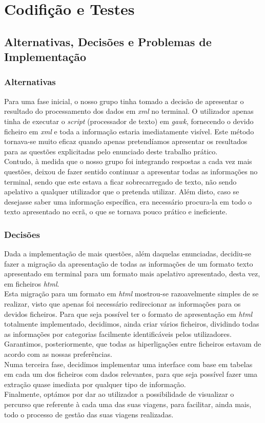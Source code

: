 \documentclass{report}
\begin{document}
\chapter{Codifição e Testes}
\section{Alternativas, Decisões e Problemas de Implementação}
\subsection{Alternativas}
	Para uma fase inicial, o nosso grupo tinha tomado a decisão de apresentar o resultado do processamento dos dados em \textit{xml} no terminal.  O utilizador apenas tinha de executar o \textit{script} (processador de texto) em \textit{gawk}, fornecendo o devido ficheiro em \textit{xml} e toda a informação estaria imediatamente visível. Este método tornava-se muito eficaz quando apenas pretendíamos apresentar os resultados para as questões explicitadas pelo enunciado deste trabalho prático.\\
	Contudo, à medida que o nosso grupo foi integrando respostas a cada vez mais questões, deixou de fazer sentido continuar a apresentar todas as informações no terminal, sendo que este estava a ficar sobrecarregado de texto, não sendo apelativo a qualquer utilizador que o pretenda utilizar. Além disto, caso se desejasse saber uma informação específica, era necessário procura-la em todo o texto apresentado no ecrã, o que se tornava pouco prático e ineficiente.\\
\subsection{Decisões}
	Dada a implementação de mais questões, além daquelas enunciadas, decidiu-se fazer a migração da apresentação de todas as informações de um formato texto apresentado em terminal para um formato mais apelativo apresentado, desta vez, em ficheiros \textit{html}.\\
	Esta migração para um formato em \textit{html} mostrou-se razoavelmente simples de se realizar, visto que apenas foi necessário redirecionar as informações para os devidos ficheiros. Para que seja possível ter o formato de apresentação em \textit{html} totalmente implementado, decidimos, ainda criar vários ficheiros, dividindo todas as informações por categorias facilmente identificáveis pelos utilizadores. Garantimos, posteriormente, que todas as hiperligações entre ficheiros estavam de acordo com as nossas preferências.\\
	Numa terceira fase, decidimos implementar uma interface com base em tabelas em cada um dos ficheiros com dados relevantes, para que seja possível fazer uma extração quase imediata por qualquer tipo de informação.\\
	Finalmente, optámos por dar ao utilizador a possibilidade de visualizar o percurso que referente à cada uma das suas viagens, para facilitar, ainda mais, todo o processo de gestão das suas viagens realizadas.\\
\end{document}
